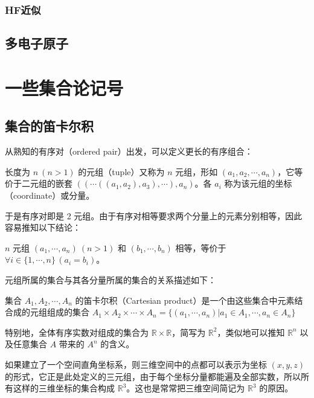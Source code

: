 \documentclass[cn,10pt,math=newtx,citestyle=gb7714-2015,bibstyle=gb7714-2015]{elegantbook}
\def\R{\mathbb R}
\begin{document}
\subsection{HF近似}

\section{多电子原子}

\appendix

\chapter{一些集合论记号}
\section{集合的笛卡尔积}
从熟知的有序对（ordered pair）出发，可以定义更长的有序组合：
\begin{definition}[元组]
   长度为 $n\ (n>1)$ 的元组（tuple）又称为 $n$ 元组，形如 $(a_1,a_2,\cdots,a_n)$，它等价于二元组的嵌套 $((\cdots((a_1,a_2),a_3),\cdots),a_n)$。各 $a_i$ 称为该元组的坐标（coordinate）或分量。
\end{definition}
于是有序对即是 2 元组。由于有序对相等要求两个分量上的元素分别相等，因此容易推知以下结论：
\begin{theorem}[元组相等的条件]
    $n$ 元组 $(a_1,\cdots,a_n)\ (n>1)$ 和 $(b_1,\cdots,b_n)$ 相等，等价于 $\forall i\in\{1,\cdots,n\}\,(a_i=b_i)$。
\end{theorem}

元组所属的集合与其各分量所属的集合的关系描述如下：

\begin{definition}[笛卡尔积]\label{def:Crtsn_prdct}
    集合 $A_1,A_2,\cdots,A_n$ 的笛卡尔积（Cartesian product）是一个由这些集合中元素结合成的元组组成的集合 $A_1\times A_2\times\cdots\times A_n=\{(a_1,\cdots,a_n)|a_1\in A_1,\cdots,a_n\in A_n\}$
\end{definition}
特别地，全体有序实数对组成的集合为 $\R\times\R$，简写为 $\R^2$，类似地可以推知 $\R^n$ 以及任意集合 $A$ 带来的 $A^n$ 的含义。
\begin{instance}
如果建立了一个空间直角坐标系，则三维空间中的点都可以表示为坐标 $(x,y,z)$ 的形式，它正是此处定义的三元组，由于每个坐标分量都能遍及全部实数，所以所有这样的三维坐标的集合构成 $\R^3$。这也是常常把三维空间简记为 $\R^3$ 的原因。
\end{instance}
\end{document}
